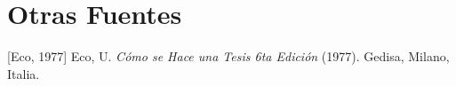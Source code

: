 \setcounter{chapter}{6}
\chapter{Otras Fuentes}
[Eco, 1977] Eco, U. \textit{Cómo se Hace una Tesis 6ta Edición} (1977). Gedisa, Milano, Italia. 
